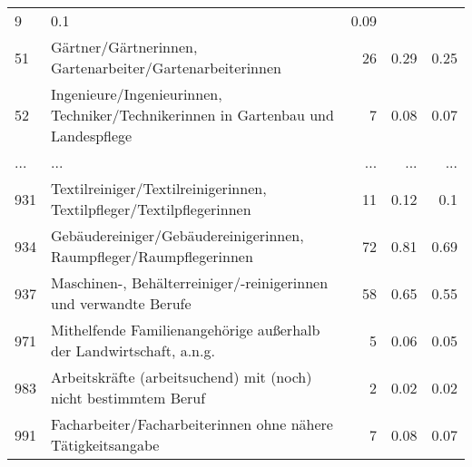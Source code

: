 \begin{longtable}{lXrrr}
          \num{9} &
          \num[round-mode=places,round-precision=2]{0.1} &
          \num[round-mode=places,round-precision=2]{0.09} \\
        51 & \multicolumn{1}{X}{Gärtner/Gärtnerinnen, Gartenarbeiter/Gartenarbeiterinnen} & %
          \num{26} &
          \num[round-mode=places,round-precision=2]{0.29} &
          \num[round-mode=places,round-precision=2]{0.25} \\
        52 & \multicolumn{1}{X}{Ingenieure/Ingenieurinnen, Techniker/Technikerinnen in Gartenbau und Landespflege} & %
          \num{7} &
          \num[round-mode=places,round-precision=2]{0.08} &
          \num[round-mode=places,round-precision=2]{0.07} \\
       ... & ... & ... & ... & ... \\
        931 & \multicolumn{1}{X}{Textilreiniger/Textilreinigerinnen, Textilpfleger/Textilpflegerinnen} & %
          \num{11} &
          \num[round-mode=places,round-precision=2]{0.12} &
          \num[round-mode=places,round-precision=2]{0.1} \\

        934 & \multicolumn{1}{X}{Gebäudereiniger/Gebäudereinigerinnen, Raumpfleger/Raumpflegerinnen} & %
          \num{72} &
          \num[round-mode=places,round-precision=2]{0.81} &
          \num[round-mode=places,round-precision=2]{0.69} \\

        937 & \multicolumn{1}{X}{Maschinen-, Behälterreiniger/-reinigerinnen und verwandte Berufe} & %
          \num{58} &
          \num[round-mode=places,round-precision=2]{0.65} &
          \num[round-mode=places,round-precision=2]{0.55} \\

        971 & \multicolumn{1}{X}{Mithelfende Familienangehörige außerhalb der Landwirtschaft, a.n.g.} & %
          \num{5} &
          \num[round-mode=places,round-precision=2]{0.06} &
          \num[round-mode=places,round-precision=2]{0.05} \\

        983 & \multicolumn{1}{X}{Arbeitskräfte (arbeitsuchend) mit (noch) nicht bestimmtem Beruf} & %
          \num{2} &
          \num[round-mode=places,round-precision=2]{0.02} &
          \num[round-mode=places,round-precision=2]{0.02} \\

        991 & \multicolumn{1}{X}{Facharbeiter/Facharbeiterinnen ohne nähere Tätigkeitsangabe} & %
          \num{7} &
          \num[round-mode=places,round-precision=2]{0.08} &
          \num[round-mode=places,round-precision=2]{0.07} \\


\end{longtable}
